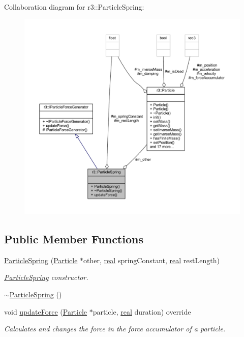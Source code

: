 Collaboration diagram for r3\+:\+:Particle\+Spring\+:\nopagebreak
\begin{figure}[H]
\begin{center}
\leavevmode
\includegraphics[width=350pt]{classr3_1_1_particle_spring__coll__graph}
\end{center}
\end{figure}
\subsection*{Public Member Functions}
\begin{DoxyCompactItemize}
\item 
\mbox{\hyperlink{classr3_1_1_particle_spring_af9b9193c28a36a6e070483136f63a9ab}{Particle\+Spring}} (\mbox{\hyperlink{classr3_1_1_particle}{Particle}} $\ast$other, \mbox{\hyperlink{namespacer3_ab2016b3e3f743fb735afce242f0dc1eb}{real}} spring\+Constant, \mbox{\hyperlink{namespacer3_ab2016b3e3f743fb735afce242f0dc1eb}{real}} rest\+Length)
\begin{DoxyCompactList}\small\item\em \mbox{\hyperlink{classr3_1_1_particle_spring}{Particle\+Spring}} constructor. \end{DoxyCompactList}\item 
\mbox{\hyperlink{classr3_1_1_particle_spring_a958707806b191f920e44eaff86aa124e}{$\sim$\+Particle\+Spring}} ()
\item 
void \mbox{\hyperlink{classr3_1_1_particle_spring_a113e7bdf36d5edf020abecec5a0fb730}{update\+Force}} (\mbox{\hyperlink{classr3_1_1_particle}{Particle}} $\ast$particle, \mbox{\hyperlink{namespacer3_ab2016b3e3f743fb735afce242f0dc1eb}{real}} duration) override
\begin{DoxyCompactList}\small\item\em Calculates and changes the force in the force accumulator of a particle. \end{DoxyCompactList}\end{DoxyCompactItemize}
